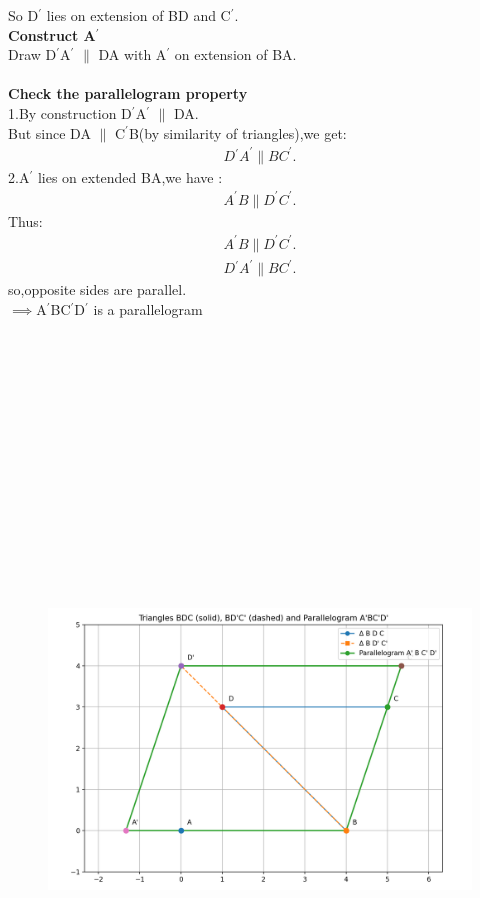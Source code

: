 \documentclass[journal]{IEEEtran}
\begin{document}
So D$^{\prime}$ lies on extension of BD and C$^{\prime}$.\\
\textbf{Construct A$^{\prime}$}\\
Draw D$^{\prime}$A$^{\prime}$ $\parallel$ DA with A$^{\prime}$ on extension of BA.\\ \\
\textbf{Check the parallelogram property}\\
1.By construction    D$^{\prime}$A$^{\prime}$ $\parallel$ DA.\\
But since DA $\parallel$ C$^{\prime}$B(by similarity of triangles),we get:
\begin{align}
    D{^\prime}A^{\prime} \parallel BC^{\prime}.
\end{align}
2.A$^{\prime}$ lies on extended BA,we have :
\begin{align}
    A^{\prime}B \parallel D^{\prime}C^{\prime}.
\end{align}
Thus:
\begin{align}
    A^{\prime}B \parallel D^{\prime}C^{\prime}.\\
D{^\prime}A^{\prime} \parallel BC^{\prime}.
\end{align}
so,opposite sides are parallel.\\
$\implies$A$^{\prime}$BC$^{\prime}$D$^{\prime}$ is a parallelogram
\\ \\ \\ \\ \\ \\ \\ \\ \\ \\ \\ \\ \\ \\ \\ 
\begin{figure}[H]
    \centering
    \includegraphics[width=1.0\columnwidth]{figs/01.png}
    \label{fig-1}
\end{figure}
\end{document}
